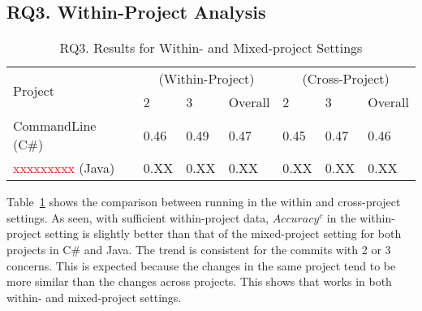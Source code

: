 \subsection{RQ3. Within-Project Analysis}

\begin{table}[t]
	\caption{RQ3. Results for Within- and Mixed-project Settings}
	\vspace{-0.1in}
	\begin{center}
		\footnotesize
		\tabcolsep 4pt
		\renewcommand{\arraystretch}{1} \begin{tabular}{p{2cm}<{\centering}|p{0.8cm}<{\centering}p{0.8cm}<{\centering}p{0.8cm}<{\centering}|p{0.8cm}<{\centering}p{0.8cm}<{\centering}p{0.8cm}<{\centering}}
			
			\hline
			\multirow{2}{*}{Project}     & \multicolumn{3}{c|}{\tool (Within-Project)} & \multicolumn{3}{c}{\tool (Cross-Project)}\\
			\cline{2-7}
			                               &        2       &      3         & Overall  &      2       &        3     & Overall    \\
			
			\hline
			CommandLine (C\#)   &  0.46  & 0.49  &     0.47          &	0.45   & 0.47 &	0.46	       \\
                        \textcolor{red}{xxxxxxxxx} (Java)   &  0.XX  & 0.XX  &     0.XX          &	0.XX   & 0.XX &	0.XX	       \\

			\hline
		\end{tabular}
		\label{RQ3-result}
		
	\end{center}
\end{table}


Table~\ref{RQ3-result} shows the comparison between running {\tool} in
the within and cross-project settings. As seen, with sufficient
within-project data, $Accuracy^{c}$ in the within-project setting is
slightly better than that of the mixed-project setting for both
projects in C\# and Java. The trend is consistent for the commits with
2 or 3 concerns. This is expected because the changes in the same
project tend to be more similar than the changes across projects.
This shows that {\tool} works in both within- and mixed-project
settings.

